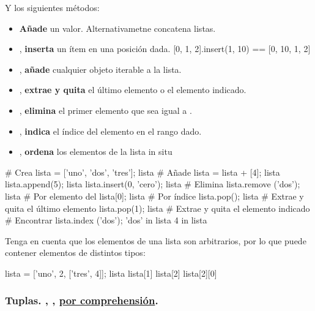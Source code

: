 Y los siguientes métodos:

\begin{itemize}
\item {} \textbf{Añade} un valor. Alternativametne   concatena listas.
\item {}, \textbf{inserta} un ítem en una posición dada. 
{\tiny [0, 1, 2].insert(1, 10) == [0, 10, 1, 2]}
\item {}, \textbf{añade} cualquier objeto iterable a la lista.
\item {}, \textbf{extrae y quita} el último elemento o el elemento indicado.
\item {}, \textbf{elimina} el primer elemento que sea igual a .
\item {}, \textbf{indica} el índice del elemento  en el rango dado.
\item {}, \textbf{ordena} los elementos de la lista in situ
\end{itemize}



\begin{pyconsole}[][frame=single]
# Crea
lista = ['uno', 'dos', 'tres']; lista
# Añade
lista = lista + [4]; lista
lista.append(5); lista
lista.insert(0, 'cero'); lista
# Elimina
lista.remove ('dos'); lista # Por elemento
del lista[0]; lista  # Por índice
lista.pop(); lista  # Extrae y quita el último elemento
lista.pop(1); lista # Extrae y quita el elemento indicado
# Encontrar
lista.index ('dos'); 
'dos' in lista
4 in lista
\end{pyconsole}


Tenga en cuenta que los elementos de una lista son arbitrarios, por lo que puede contener elementos de distintos tipos:

\begin{pyconsole}[][frame=single]
lista = ['uno', 2, ['tres', 4]]; lista
lista[1]
lista[2] 
lista[2][0]
\end{pyconsole}








\subsubsection*{Tuplas.  ,  , \underline{por comprehensión}.}

